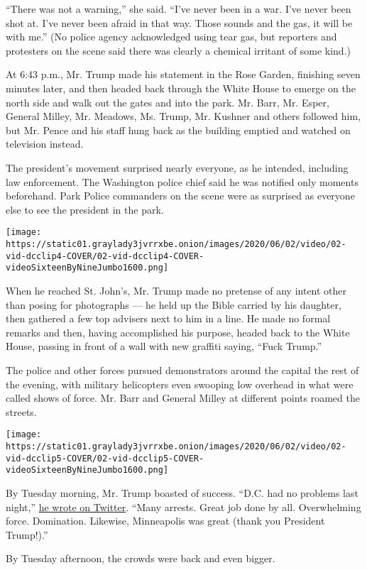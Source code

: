 ``There was not a warning,'' she said. ``I've never been in a war. I've
never been shot at. I've never been afraid in that way. Those sounds and
the gas, it will be with me.'' (No police agency acknowledged using tear
gas, but reporters and protesters on the scene said there was clearly a
chemical irritant of some kind.)

At 6:43 p.m., Mr. Trump made his statement in the Rose Garden, finishing
seven minutes later, and then headed back through the White House to
emerge on the north side and walk out the gates and into the park. Mr.
Barr, Mr. Esper, General Milley, Mr. Meadows, Ms. Trump, Mr. Kushner and
others followed him, but Mr. Pence and his staff hung back as the
building emptied and watched on television instead.

The president's movement surprised nearly everyone, as he intended,
including law enforcement. The Washington police chief said he was
notified only moments beforehand. Park Police commanders on the scene
were as surprised as everyone else to see the president in the park.

\texttt{[image: https://static01.graylady3jvrrxbe.onion/images/2020/06/02/video/02-vid-dcclip4-COVER/02-vid-dcclip4-COVER-videoSixteenByNineJumbo1600.png]}

When he reached St. John's, Mr. Trump made no pretense of any intent
other than posing for photographs --- he held up the Bible carried by
his daughter, then gathered a few top advisers next to him in a line. He
made no formal remarks and then, having accomplished his purpose, headed
back to the White House, passing in front of a wall with new graffiti
saying, ``Fuck Trump.''

The police and other forces pursued demonstrators around the capital the
rest of the evening, with military helicopters even swooping low
overhead in what were called shows of force. Mr. Barr and General Milley
at different points roamed the streets.

\texttt{[image: https://static01.graylady3jvrrxbe.onion/images/2020/06/02/video/02-vid-dcclip5-COVER/02-vid-dcclip5-COVER-videoSixteenByNineJumbo1600.png]}

By Tuesday morning, Mr. Trump boasted of success. ``D.C. had no problems
last night,''
\href{https://twitter.com/realDonaldTrump/status/1267808120136511489}{he
wrote on Twitter}. ``Many arrests. Great job done by all. Overwhelming
force. Domination. Likewise, Minneapolis was great (thank you President
Trump!).''

By Tuesday afternoon, the crowds were back and even bigger.

